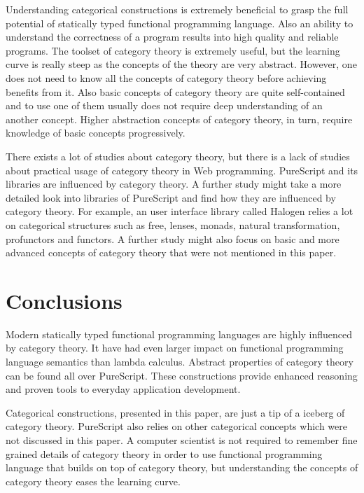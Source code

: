 \documentclass[article]{aaltoseries}
\begin{document}
Understanding categorical constructions is extremely beneficial to grasp the
full potential of statically typed functional programming language. Also an
ability to understand the correctness of a program results into high quality and
reliable programs. The toolset of category theory is extremely useful, but the
learning curve is really steep as the concepts of the theory are very abstract.
However, one does not need to know all the concepts of category theory before
achieving benefits from it. Also basic concepts of category theory are quite
self-contained and to use one of them usually does not require deep
understanding of an another concept. Higher abstraction concepts of category
theory, in turn, require knowledge of basic concepts progressively.
 
There exists a lot of studies about category theory, but there is a lack of
studies about practical usage of category theory in Web programming. PureScript
and its libraries are influenced by category theory. A further study might take
a more detailed look into libraries of PureScript and find how they are
influenced by category theory. For example, an user interface library called
Halogen relies a lot on categorical structures such as free, lenses, monads,
natural transformation, profunctors and functors. A further study might also
focus on basic and more advanced concepts of category theory that were not
mentioned in this paper.



\section{Conclusions}

Modern statically typed functional programming languages are highly influenced
by category theory. It have had even larger impact on functional programming
language semantics than lambda calculus. Abstract properties of category theory
can be found all over PureScript. These constructions provide enhanced
reasoning and proven tools to everyday application development.
 
Categorical constructions, presented in this paper, are just a tip of a
iceberg of category theory. PureScript also relies on other categorical concepts
which were not discussed in this paper. A computer scientist is not required to
remember fine grained details of category theory in order to use functional
programming language that builds on top of category theory, but understanding
the concepts of category theory eases the learning curve.




\end{document}
